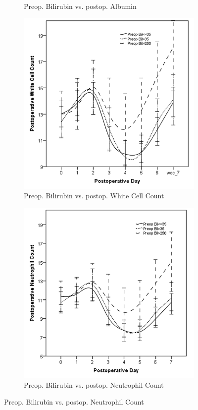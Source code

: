 \begin{figure}[p]
\begin{subfigure}{0.48\textwidth}
		\caption{Preop. Bilirubin vs. postop. Albumin}
		\label{fig:sirs_bil_alb}
	\end{subfigure}
	
	\begin{subfigure}{0.48\textwidth}
		\centering
		\includegraphics[width=\textwidth]{Figures/sirs_bil_wcc}
		\caption{Preop. Bilirubin vs. postop. White Cell Count}
		\label{fig:sirs_bil_wcc}
	\end{subfigure}
	\hfill
	\begin{subfigure}{0.48\textwidth}
		\centering
		\includegraphics[width=\textwidth]{Figures/sirs_bil_neut}
		\caption{Preop. Bilirubin vs. postop. Neutrophil Count}
		\label{fig:sirs_bil_neut}
	\end{subfigure}	
\end{figure}
